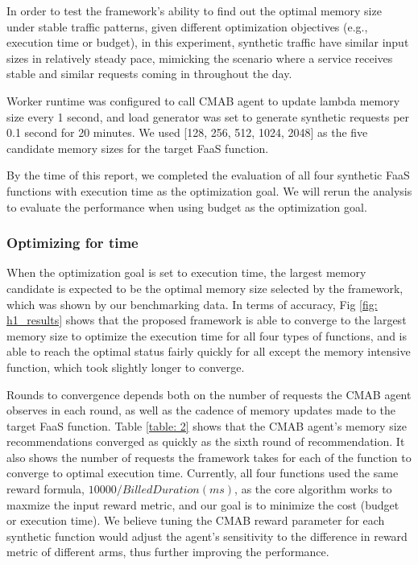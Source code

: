 \documentclass[conference]{IEEEtran}
\begin{document}
In order to test the framework's ability to find out the optimal memory size under stable traffic patterns, given different optimization objectives (e.g., execution time or budget), in this experiment, synthetic traffic have similar input sizes in relatively steady pace, mimicking the scenario where a service receives stable and similar requests coming in throughout the day.

Worker runtime was configured to call CMAB agent to update lambda memory size every 1 second, and load generator was set to generate synthetic requests per 0.1 second for 20 minutes. We used [128, 256, 512, 1024, 2048] as the five candidate memory sizes for the target FaaS function.

By the time of this report, we completed the evaluation of all four synthetic FaaS functions with execution time as the optimization goal. We will rerun the analysis to evaluate the performance when using budget as the optimization goal.

\subsubsection{Optimizing for time}

When the optimization goal is set to execution time, the largest memory candidate is expected to be the optimal memory size selected by the framework, which was shown by our benchmarking data. In terms of accuracy, Fig \ref{fig: h1_results} shows that the proposed framework is able to converge to the largest memory size to optimize the execution time for all four types of functions, and is able to reach the optimal status fairly quickly for all except the memory intensive function, which took slightly longer to converge.

Rounds to convergence depends both on the number of requests the CMAB agent observes in each round, as well as the cadence of memory updates made to the target FaaS function. Table \ref{table: 2} shows that the CMAB agent's memory size recommendations converged as quickly as the sixth round of recommendation. It also shows the number of requests the framework takes for each of the function to converge to optimal execution time. Currently, all four functions used the same reward formula, $10000/Billed Duration(ms)$, as the core algorithm works to maxmize the input reward metric, and our goal is to minimize the cost (budget or execution time). We believe tuning the CMAB reward parameter for each synthetic function would adjust the agent's sensitivity to the difference in reward metric of different arms, thus further improving the performance.
\end{document}
